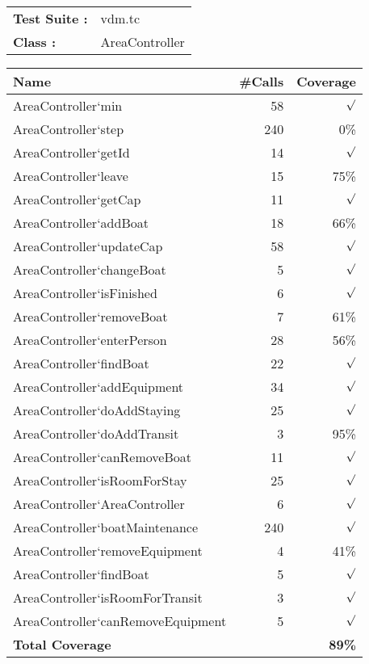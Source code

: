 \begin{tabular}{p{25mm}l}
{\bf Test Suite :} & vdm.tc \\ 
{\bf Class :} & AreaController \\ 
\end{tabular}

\begin{longtable}{|l|r|r|}\hline
{\bf Name} & {\bf \#Calls} & {\bf Coverage} \\ \hline\hline
\endhead
AreaController`min & 58 & $\surd$ \\ \hline
AreaController`step & 240 & 0\% \\ \hline
AreaController`getId & 14 & $\surd$ \\ \hline
AreaController`leave & 15 & 75\% \\ \hline
AreaController`getCap & 11 & $\surd$ \\ \hline
AreaController`addBoat & 18 & 66\% \\ \hline
AreaController`updateCap & 58 & $\surd$ \\ \hline
AreaController`changeBoat & 5 & $\surd$ \\ \hline
AreaController`isFinished & 6 & $\surd$ \\ \hline
AreaController`removeBoat & 7 & 61\% \\ \hline
AreaController`enterPerson & 28 & 56\% \\ \hline
AreaController`findBoat & 22 & $\surd$ \\ \hline
AreaController`addEquipment & 34 & $\surd$ \\ \hline
AreaController`doAddStaying & 25 & $\surd$ \\ \hline
AreaController`doAddTransit & 3 & 95\% \\ \hline
AreaController`canRemoveBoat & 11 & $\surd$ \\ \hline
AreaController`isRoomForStay & 25 & $\surd$ \\ \hline
AreaController`AreaController & 6 & $\surd$ \\ \hline
AreaController`boatMaintenance & 240 & $\surd$ \\ \hline
AreaController`removeEquipment & 4 & 41\% \\ \hline
AreaController`findBoat & 5 & $\surd$ \\ \hline
AreaController`isRoomForTransit & 3 & $\surd$ \\ \hline
AreaController`canRemoveEquipment & 5 & $\surd$ \\ \hline
\hline
{\bf Total Coverage} & & {\bf 89\%} \\ \hline
\end{longtable}

